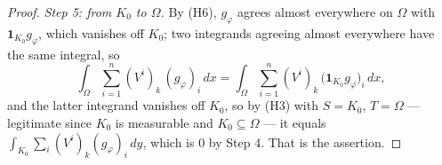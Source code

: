 \begin{proof}
\emph{Step 5: from $K_0$ to $\Omega$.}  By (H6), $g_\varphi$ agrees almost
everywhere on $\Omega$ with $\mathbf1_{K_0}g_\varphi$, which vanishes off
$K_0$; two integrands agreeing almost everywhere have the same integral, so
\[
\int_\Omega\sum_{i=1}^n(V^i)_k\,(g_\varphi)_i\,dx
=\int_\Omega\sum_{i=1}^n(V^i)_k\,\bigl(\mathbf1_{K_0}g_\varphi\bigr)_i\,dx ,
\]
and the latter integrand vanishes off $K_0$, so by (H3) with $S=K_0$,
$T=\Omega$ --- legitimate since $K_0$ is measurable and $K_0\subseteq\Omega$ ---
it equals $\int_{K_0}\sum_i(V^i)_k(g_\varphi)_i\,dy$, which is $0$ by Step 4.
That is the assertion.
\end{proof}
